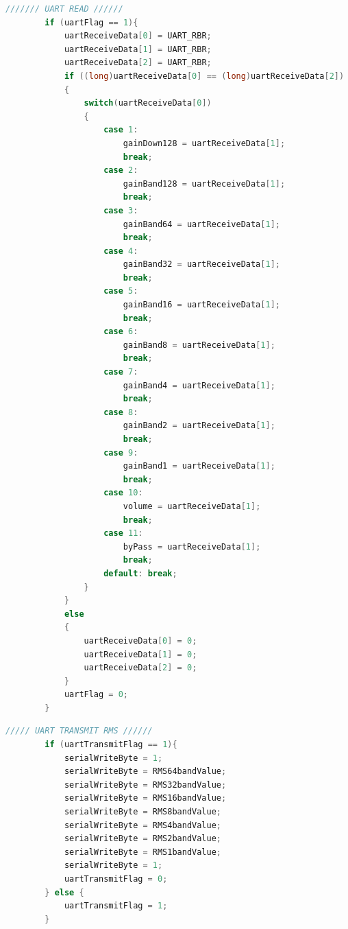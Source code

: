 \begin{lstlisting}[language=C, caption = {Read the incomming packet from FIFO buffer},label={listingUartRead}]
		/////// UART READ //////
		if (uartFlag == 1){	
			uartReceiveData[0] = UART_RBR;
			uartReceiveData[1] = UART_RBR;
			uartReceiveData[2] = UART_RBR;
			if ((long)uartReceiveData[0] == (long)uartReceiveData[2])
			{
				switch(uartReceiveData[0])
				{
					case 1:
						gainDown128 = uartReceiveData[1];
						break;
					case 2:
						gainBand128 = uartReceiveData[1];
						break;
					case 3:
						gainBand64 = uartReceiveData[1];
						break;
					case 4:
						gainBand32 = uartReceiveData[1];
						break;
					case 5:
						gainBand16 = uartReceiveData[1];
						break;
					case 6:
						gainBand8 = uartReceiveData[1];
						break;
					case 7:
						gainBand4 = uartReceiveData[1];
						break;
					case 8:
						gainBand2 = uartReceiveData[1];
						break;
					case 9:
						gainBand1 = uartReceiveData[1];
						break;
					case 10:
						volume = uartReceiveData[1];
						break;
					case 11:
						byPass = uartReceiveData[1];
						break;
					default: break;
				}	
			} 
			else 
			{
				uartReceiveData[0] = 0;
				uartReceiveData[1] = 0;
				uartReceiveData[2] = 0;
			}
			uartFlag = 0;
		}	
\end{lstlisting}

\begin{lstlisting}[language=C, caption = {Transmit the RMS values of all bands. Only runs every second time},label={listingUartTransmit}]
		///// UART TRANSMIT RMS //////
		if (uartTransmitFlag == 1){
			serialWriteByte = 1;
			serialWriteByte = RMS64bandValue;
			serialWriteByte = RMS32bandValue;
			serialWriteByte = RMS16bandValue;
			serialWriteByte = RMS8bandValue;
			serialWriteByte = RMS4bandValue;
			serialWriteByte = RMS2bandValue;
			serialWriteByte = RMS1bandValue;
			serialWriteByte = 1;
			uartTransmitFlag = 0;
		} else {
			uartTransmitFlag = 1;
		}
\end{lstlisting}
